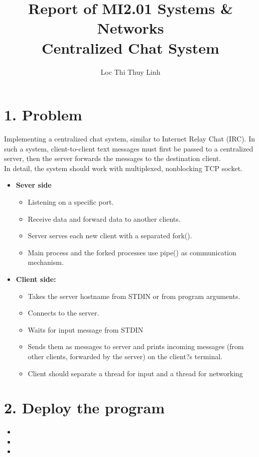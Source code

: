 \documentclass[11pt, oneside]{report}
\title{Report of MI2.01 Systems \& Networks\\
\vskip 2cm
Centralized Chat System}
\author{Loc Thi Thuy Linh}
\begin{document}
\maketitle

\section*{1. Problem}
Implementing a centralized chat system, similar to Internet Relay Chat (IRC). In such a system, client-to-client text messages must first be passed to a centralized server, then the server forwards the messages to the destination client.
\\
In detail, the system should work with multiplexed, nonblocking TCP socket.
\begin{itemize}
 \item \textbf{Sever side} 
 	\begin{itemize}
	\item Listening on a specific port.
	\item Receive data and forward data to another clients.
	\item Server serves each new client with a separated fork().
	\item Main process and the forked processes use pipe() as communication mechanism.
	\end{itemize}
\item \textbf{Client side:} 
 	\begin{itemize}
	\item Takes the server hostname from STDIN or from program arguments.
	\item Connects to the server.
	\item Waits for input message from STDIN
	\item Sends them as messages to server and prints incoming messages (from other clients, forwarded by the server) on the client?s terminal.
	\item Client should separate a thread for input and a thread for networking
	\end{itemize}
\end{itemize}

\section*{2. Deploy the program}
\begin{itemize}
\item 
\item 

\item 

\end{itemize}
\end{document}
